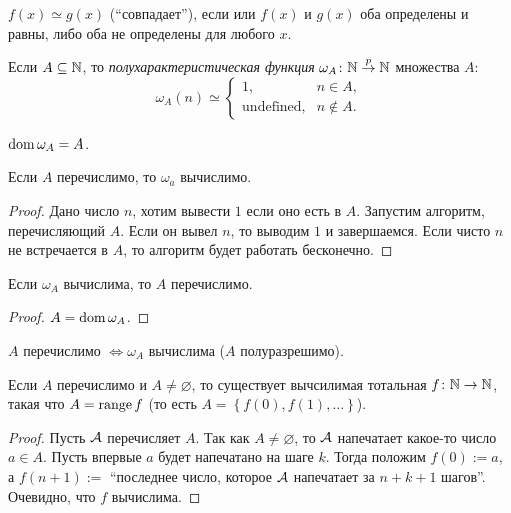 \begin{definition}
    $f(x) \simeq g(x)$ (\enquote{совпадает}), если или $f(x)$ и $g(x)$ оба определены и равны, либо оба не определены для любого $x$.
\end{definition}

\begin{definition}
    Если $A \subseteq \N$, то \textit{полухарактеристическая функция} $\omega_A \colon \N \pto \N$ множества $A$:
    $$
        \omega_A(n) \simeq \begin{cases}
            1, &n \in A, \\
            \text{undefined}, &n \notin A.
        \end{cases}
    $$
\end{definition}

\begin{comment*}
    $\dom \omega_A = A$.
\end{comment*}

\begin{statement}
    Если $A$ перечислимо, то $\omega_a$ вычислимо.
\end{statement}

\begin{proof}
    Дано число $n$, хотим вывести $1$ если оно есть в $A$.
    Запустим алгоритм, перечисляющий $A$. Если он вывел $n$, то выводим $1$ и завершаемся.
    Если чисто $n$ не встречается в $A$, то алгоритм будет работать бесконечно.
\end{proof}

\begin{proposal}
    Если $\omega_A$ вычислима, то $A$ перечислимо.
\end{proposal}

\begin{proof}
    $A = \dom \omega_A$.
\end{proof}

\begin{corollary}
    $A$ перечислимо $\iff \omega_A$ вычислима ($A$ полуразрешимо).
\end{corollary}

\begin{statement}
    Если $A$ перечислимо и $A \neq \varnothing$, то существует вычсилимая тотальная $f \colon \N \to \N$, такая что $A = \range f$ (то есть $A = \left\{f(0), f(1), \dots\right\}$).
\end{statement}

\begin{proof}
    Пусть $\AA$ перечисляет $A$. Так как $A \neq \varnothing$, то $\AA$ напечатает какое-то число $a \in A$.
    Пусть впервые $a$ будет напечатано на шаге $k$.
    Тогда положим $f(0) := a$, а $f(n + 1) := $ \enquote{последнее число, которое $\AA$ напечатает за $n + k + 1$ шагов}.
    Очевидно, что $f$ вычислима.
\end{proof}


